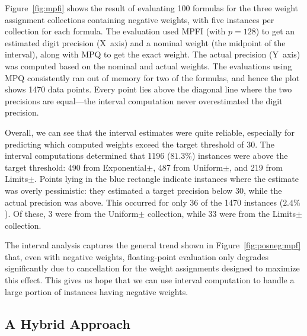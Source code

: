 \documentclass[letterpaper,USenglish,cleveref, autoref, thm-restate]{lipics-v2021}
\begin{document}
Figure~\ref{fig:mpfi} shows the result of evaluating 100 formulas for
the three weight assignment collections containing negative weights,
with five instances per collection for each formula.  
The evaluation used
MPFI (with $p=128$) to get an estimated digit precision (X~axis) and
a nominal weight (the midpoint of the interval), along with MPQ to get
the exact weight.  The actual precision (Y~axis) was computed based on the
nominal and actual weights.  The evaluations using MPQ consistently ran out of
memory for two of the formulas, and hence the plot shows 1470
data points.  
Every point lies above the diagonal line where the two precisions are equal---the interval computation never overestimated the digit
precision.


Overall, we can see that the interval estimates were quite reliable,
especially for predicting which computed weights exceed the target
threshold of 30.
The
interval computations determined that 1196 ($81.3\%$) instances were
above the target threshold: 490 from \textsf{Exponential$\pm$}, 487 from
\textsf{Uniform$\pm$}, and 219 from \textsf{Limits$\pm$}.
Points lying in the blue rectangle
indicate instances where the estimate was overly pessimistic: they
estimated a target precision below 30, while the actual precision was
above.  This occurred for only 36 of the 1470 instances ($2.4\%$).  Of
these, 3 were from the \textsf{Uniform$\pm$} collection, while 33 were
from the \textsf{Limits$\pm$} collection.  

The interval analysis captures the general trend shown in
Figure~\ref{fig:posneg:mpf} that, even with negative
weights, floating-point evaluation only degrades significantly due to cancellation
for the weight assignments designed to maximize
this effect.  This gives us hope that we can use interval computation
to handle a large portion of instances having negative weights.

\subsection{A Hybrid Approach}
\label{sect:hybrid}

\begin{table}
  \caption{Performance Comparison of Different Implementation Strategies.  Run entries of the form $S$+$F$ indicate that $S$ runs
  were successful and $F$ runs either ran out of memory or failed to meet the target precision.  Our hybrid strategy is shown in red.}
  \label{tab:compare}
\end{table}
\end{document}
